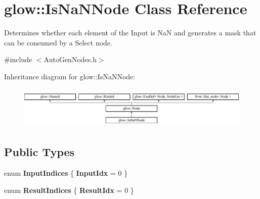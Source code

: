 \hypertarget{classglow_1_1_is_na_n_node}{}\section{glow\+:\+:Is\+Na\+N\+Node Class Reference}
\label{classglow_1_1_is_na_n_node}


Determines whether each element of the Input is NaN and generates a mask that can be consumed by a Select node.  




{\ttfamily \#include $<$Auto\+Gen\+Nodes.\+h$>$}

Inheritance diagram for glow\+:\+:Is\+Na\+N\+Node\+:\begin{figure}[H]
\begin{center}
\leavevmode
\includegraphics[height=2.028986cm]{classglow_1_1_is_na_n_node}
\end{center}
\end{figure}
\subsection*{Public Types}
\begin{DoxyCompactItemize}
\item 
\mbox{\label{classglow_1_1_is_na_n_node_aa7882e42c9c438a385e60650b10d514d}} 
enum {\bfseries Input\+Indices} \{ {\bfseries Input\+Idx} = 0
 \}
\item 
\mbox{\label{classglow_1_1_is_na_n_node_a8a4466ba994918600609b5197732ada2}} 
enum {\bfseries Result\+Indices} \{ {\bfseries Result\+Idx} = 0
 \}
\end{DoxyCompactItemize}
